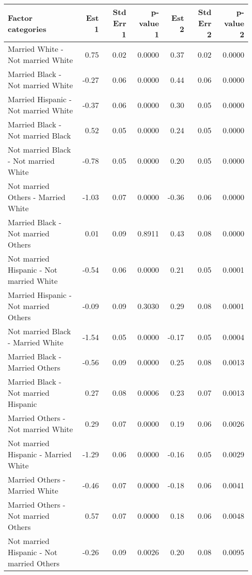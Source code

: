 \begin{table}[H]
\footnotesize
\centering
\begin{tabular}{lrrrrrr}
  \hline
  Factor categories & Est 1 & Std Err 1 & p-value 1 & Est 2 & Std Err 2 & p-value 2 \\ 
  \hline
    Married White 	-  Not married White & 0.75 & 0.02 & 0.0000 & 0.37 & 0.02 & 0.0000 \\ 
    Married Black 	-  Not married White & -0.27 & 0.06 & 0.0000 & 0.44 & 0.06 & 0.0000 \\ 
    Married Hispanic 	-  Not married White & -0.37 & 0.06 & 0.0000 & 0.30 & 0.05 & 0.0000 \\ 
    Married Black 	-  Not married Black & 0.52 & 0.05 & 0.0000 & 0.24 & 0.05 & 0.0000 \\ 
    Not married Black 	-  Not married White & -0.78 & 0.05 & 0.0000 & 0.20 & 0.05 & 0.0000 \\ 
    Not married Others 	-  Married White & -1.03 & 0.07 & 0.0000 & -0.36 & 0.06 & 0.0000 \\ 
    Married Black 	-  Not married Others & 0.01 & 0.09 & 0.8911 & 0.43 & 0.08 & 0.0000 \\ 
    Not married Hispanic -  Not married White & -0.54 & 0.06 & 0.0000 & 0.21 & 0.05 & 0.0001 \\ 
    Married Hispanic 	-  Not married Others & -0.09 & 0.09 & 0.3030 & 0.29 & 0.08 & 0.0001 \\ 
    Not married Black 	-  Married White & -1.54 & 0.05 & 0.0000 & -0.17 & 0.05 & 0.0004 \\ 
    Married Black 	-  Married Others & -0.56 & 0.09 & 0.0000 & 0.25 & 0.08 & 0.0013 \\ 
    Married Black 	-  Not married Hispanic & 0.27 & 0.08 & 0.0006 & 0.23 & 0.07 & 0.0013 \\ 
    Married Others 	-  Not married White & 0.29 & 0.07 & 0.0000 & 0.19 & 0.06 & 0.0026 \\ 
    Not married Hispanic -  Married White & -1.29 & 0.06 & 0.0000 & -0.16 & 0.05 & 0.0029 \\ 
    Married Others 	-  Married White & -0.46 & 0.07 & 0.0000 & -0.18 & 0.06 & 0.0041 \\ 
    Married Others 	-  Not married Others & 0.57 & 0.07 & 0.0000 & 0.18 & 0.06 & 0.0048 \\ 
    Not married Hispanic -  Not married Others & -0.26 & 0.09 & 0.0026 & 0.20 & 0.08 & 0.0095 \\ 

\end{tabular}
\end{table}
